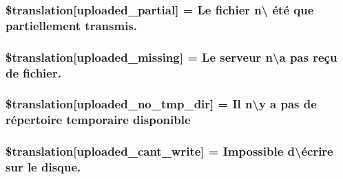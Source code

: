\subsubsection[{\$translation}]{\setlength{\rightskip}{0pt plus 5cm}\$translation\mbox{[}\textquotesingle{}uploaded\+\_\+partial\textquotesingle{}\mbox{]} = \textquotesingle{}Le fichier n\textbackslash{}\textquotesingle{} été que partiellement transmis.\textquotesingle{}}\label{class_8upload_8fr___f_r_8php_a967c17da21b0a2d3bd65cca3a9ca0ea8}
\hypertarget{class_8upload_8fr___f_r_8php_a0cce433260be65f1f35853a6b4b8952b}{}
\subsubsection[{\$translation}]{\setlength{\rightskip}{0pt plus 5cm}\$translation\mbox{[}\textquotesingle{}uploaded\+\_\+missing\textquotesingle{}\mbox{]} = \textquotesingle{}Le serveur n\textbackslash{}\textquotesingle{}a pas reçu de fichier.\textquotesingle{}}\label{class_8upload_8fr___f_r_8php_a0cce433260be65f1f35853a6b4b8952b}
\hypertarget{class_8upload_8fr___f_r_8php_ae3cdc68fe248399f77246c91b0555341}{}
\subsubsection[{\$translation}]{\setlength{\rightskip}{0pt plus 5cm}\$translation\mbox{[}\textquotesingle{}uploaded\+\_\+no\+\_\+tmp\+\_\+dir\textquotesingle{}\mbox{]} = \textquotesingle{}Il n\textbackslash{}\textquotesingle{}y a pas de répertoire temporaire disponible\textquotesingle{}}\label{class_8upload_8fr___f_r_8php_ae3cdc68fe248399f77246c91b0555341}
\hypertarget{class_8upload_8fr___f_r_8php_af368fee3b41bc05e6b208c1557a00c00}{}
\subsubsection[{\$translation}]{\setlength{\rightskip}{0pt plus 5cm}\$translation\mbox{[}\textquotesingle{}uploaded\+\_\+cant\+\_\+write\textquotesingle{}\mbox{]} = \textquotesingle{}Impossible d\textbackslash{}\textquotesingle{}écrire sur le disque.\textquotesingle{}}\label{class_8upload_8fr___f_r_8php_af368fee3b41bc05e6b208c1557a00c00}
\hypertarget{class_8upload_8fr___f_r_8php_a01c69a4c8556602b3892dce727bace11}{}
